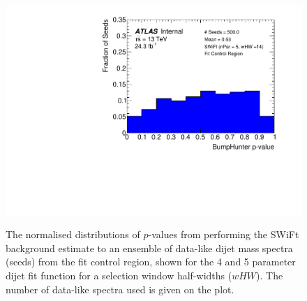 \begin{figure}[!b]
 {                                                    
  \includegraphics[width=0.48\linewidth, angle=0]{figs/Dibjet/LowMass/FitStudy_min566/pVal_bumpHunter_corrFitCR_5para_low14_high14.pdf}
}                                                                                              
\caption[The normalised distributions of \bh{} \mbox{$p$-value}s from performing the SWiFt background estimate to an ensemble of
          data-like dijet mass spectra from the \lm{} fit control region.]
        {\label{fig:bumpH_spuriousSignal}
          The normalised distributions of \bh{} \mbox{$p$-value}s from performing the SWiFt background estimate to an ensemble of
          data-like dijet mass spectra (seeds) from the \lm{} fit control region,
          shown for the 4 and 5 parameter dijet fit function for a selection window half-widths ($wHW$). 
          The number of data-like spectra used is given on the plot.
}
\end{figure}

